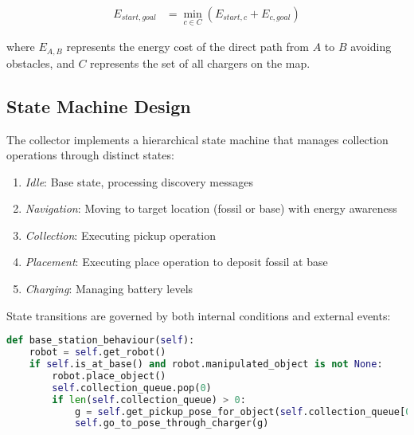 \documentclass{csfourzero}
\begin{document}
\begin{align*}
E_{start,goal} &= \min_{c \in C} (E_{start,c} + E_{c,goal})
\end{align*}

where $E_{A,B}$ represents the energy cost of the direct path from \(A\) to \(B\) avoiding obstacles, and $C$ represents the set of all chargers on the map.

\subsection{State Machine Design}

The collector implements a hierarchical state machine \cite{burgard2002coordinated} that manages collection operations through distinct states:

\begin{enumerate}
    \item \textit{Idle}: Base state, processing discovery messages
    \item \textit{Navigation}: Moving to target location (fossil or base) with energy awareness
    \item \textit{Collection}: Executing pickup operation
    \item \textit{Placement}: Executing place operation to deposit fossil at base
    \item \textit{Charging}: Managing battery levels
\end{enumerate}

\noindent State transitions are governed by both internal conditions and external events:

\begin{lstlisting}[language=Python]
def base_station_behaviour(self):
    robot = self.get_robot()
    if self.is_at_base() and robot.manipulated_object is not None:
        robot.place_object()
        self.collection_queue.pop(0)
        if len(self.collection_queue) > 0:
            g = self.get_pickup_pose_for_object(self.collection_queue[0])
            self.go_to_pose_through_charger(g)
\end{lstlisting}
\end{document}
